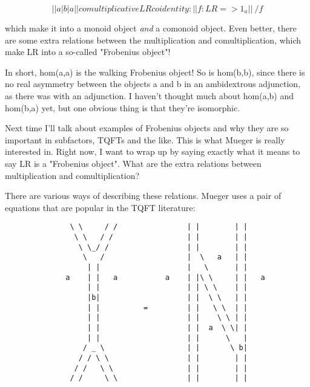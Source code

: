 $$
                            |   |    
                     a      | b |     a 
                            |   |                    comultiplicative
                            L   R                       coidentity:
                            |   |                      f: LR => 1_{a}
                            |   |
                             \ /
                              f
$$
    
which make it into a monoid object \emph{and} a comonoid object.  Even
better, there are some extra relations between the multiplication and
comultiplication, which make LR into a so-called "Frobenius object"!

In short, hom(a,a) is the walking Frobenius object!  So is hom(b,b),
since there is no real asymmetry between the objects a and b in an
ambidextrous adjunction, as there was with an adjunction.  I haven't
thought much about hom(a,b) and hom(b,a) yet, but one obvious thing is
that they're isomorphic.


Next time I'll talk about examples of Frobenius objects and why they are
so important in subfactors, TQFTs and the like.  This is what Mueger is
really interested in.  Right now, I want to wrap up by saying exactly
what it means to say LR is a "Frobenius object".  What are the
extra relations between multiplication and comultiplication?

There are various ways of describing these relations.   Mueger uses
a pair of equations that are popular in the TQFT literature:

                                      
\begin{verbatim}
               \ \     / /                | |        | |
                \ \   / /                 | |        | |
                 \ \_/ /                  | |        | |
                  \   /                   |  \   a   | |
                   | |                    |   \      | |
              a    | |   a           a    | |\ \     | |   a
                   | |                    | | \ \    | |
                   |b|                    | |  \ \   | |
                   | |          =         | |   \ \  | |
                   | |                    | |    \ \ | |
                   | |                    | |  a  \ \| |
                   | |                    | |      \   |
                  / _ \                   | |       \ b|
                 / / \ \                  | |        | |
                / /   \ \                 | |        | | 
               / /     \ \                | |        | |
\end{verbatim}
    
